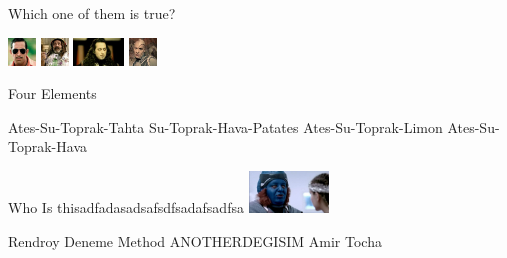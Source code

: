 \documentclass{exam}
\begin{document}
\begin{questions}
\question Which one of them is true?\newline
\begin{oneparchoices}
\CorrectChoice \includegraphics[height=2em]{arifisik.jpg}
\choice \includegraphics[height=2em]{faruk.jpg}
\choice \includegraphics[height=2em]{komutanlogar.jpeg}
\choice \includegraphics[height=2em]{216.jpg}
\end{oneparchoices}
\question Four Elements\newline
\begin{oneparchoices}
\CorrectChoice Ates-Su-Toprak-Tahta
\choice Su-Toprak-Hava-Patates
\choice Ates-Su-Toprak-Limon
\choice Ates-Su-Toprak-Hava
\end{oneparchoices}
\question Who Is thisadfadasadsafsdfsadafsadfsa\newline
\includegraphics[height=3em]{rendroy2.jpg} \newline
\begin{oneparchoices}
\CorrectChoice Rendroy
\choice Deneme Method
\CorrectChoice ANOTHERDEGISIM
\choice Amir Tocha
\end{oneparchoices}
\end{questions}
\end{document}
